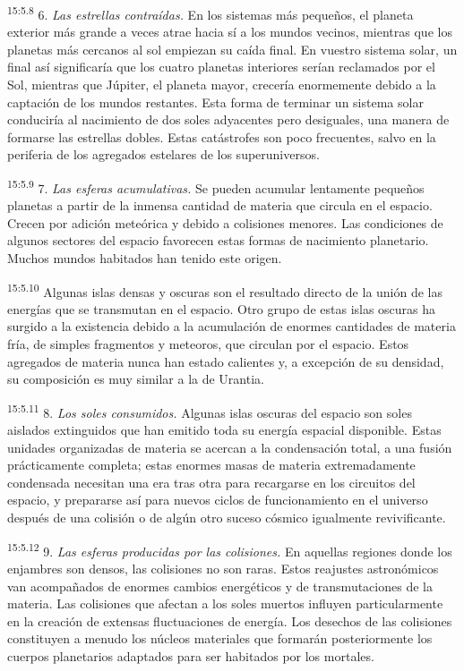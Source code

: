 \par
\textsuperscript{15:5.8} 6. \textit{Las estrellas contraídas.} En los sistemas más pequeños, el planeta exterior más grande a veces atrae hacia sí a los mundos vecinos, mientras que los planetas más cercanos al sol empiezan su caída final. En vuestro sistema solar, un final así significaría que los cuatro planetas interiores serían reclamados por el Sol, mientras que Júpiter, el planeta mayor, crecería enormemente debido a la captación de los mundos restantes. Esta forma de terminar un sistema solar conduciría al nacimiento de dos soles adyacentes pero desiguales, una manera de formarse las estrellas dobles. Estas catástrofes son poco frecuentes, salvo en la periferia de los agregados estelares de los superuniversos.

\par
\textsuperscript{15:5.9} 7. \textit{Las esferas acumulativas.} Se pueden acumular lentamente pequeños planetas a partir de la inmensa cantidad de materia que circula en el espacio. Crecen por adición meteórica y debido a colisiones menores. Las condiciones de algunos sectores del espacio favorecen estas formas de nacimiento planetario. Muchos mundos habitados han tenido este origen.

\par
\textsuperscript{15:5.10} Algunas islas densas y oscuras son el resultado directo de la unión de las energías que se transmutan en el espacio. Otro grupo de estas islas oscuras ha surgido a la existencia debido a la acumulación de enormes cantidades de materia fría, de simples fragmentos y meteoros, que circulan por el espacio. Estos agregados de materia nunca han estado calientes y, a excepción de su densidad, su composición es muy similar a la de Urantia.

\par
\textsuperscript{15:5.11} 8. \textit{Los soles consumidos.} Algunas islas oscuras del espacio son soles aislados extinguidos que han emitido toda su energía espacial disponible. Estas unidades organizadas de materia se acercan a la condensación total, a una fusión prácticamente completa; estas enormes masas de materia extremadamente condensada necesitan una era tras otra para recargarse en los circuitos del espacio, y prepararse así para nuevos ciclos de funcionamiento en el universo después de una colisión o de algún otro suceso cósmico igualmente revivificante.

\par
\textsuperscript{15:5.12} 9. \textit{Las esferas producidas por las colisiones.} En aquellas regiones donde los enjambres son densos, las colisiones no son raras. Estos reajustes astronómicos van acompañados de enormes cambios energéticos y de transmutaciones de la materia. Las colisiones que afectan a los soles muertos influyen particularmente en la creación de extensas fluctuaciones de energía. Los desechos de las colisiones constituyen a menudo los núcleos materiales que formarán posteriormente los cuerpos planetarios adaptados para ser habitados por los mortales.

